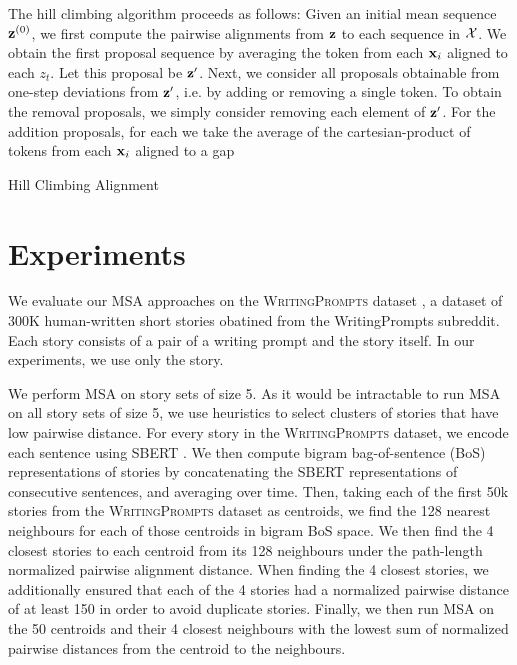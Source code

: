 \documentclass{article}
\begin{document}
The hill climbing algorithm proceeds as follows: Given an initial mean sequence $\mathbf{z}^{(0)}$,
we first compute the pairwise alignments from $\mathbf{z}$ to each sequence in $\mathcal{X}$.
We obtain the first proposal sequence by averaging the token from each $\mathbf{x}_i$ aligned
to each $z_t$.
Let this proposal be $\mathbf{z}'$.
Next, we consider all proposals obtainable from one-step deviations
from $\mathbf{z}'$, 
i.e. by adding or removing a single token.
To obtain the removal proposals, we simply consider removing each element of $\mathbf{z}'$.
For the addition proposals, for each we take the average of the cartesian-product of tokens from each
$\mathbf{x}_i$ aligned to a gap

\begin{algorithm}[h]
\begin{algorithmic}
    \EndFor
    \State{}
    \ForAll{}
    \EndFor
    \ForAll{}
    \EndFor
\EndFor
{}
\end{algorithmic}
\caption{\label{alg:hillclimbing}
Hill Climbing Alignment
}
\end{algorithm}

\section{Experiments}
We evaluate our MSA approaches on the \textsc{WritingPrompts} dataset \citep{fan2018writingprompts},
a dataset of 300K human-written short stories obatined from the WritingPrompts subreddit.
Each story consists of a pair of a writing prompt and the story itself.
In our experiments, we use only the story.

We perform MSA on story sets of size 5.
As it would be intractable to run MSA on all story sets of size 5,
we use heuristics to select clusters of stories that have low pairwise distance.
For every story in the \textsc{WritingPrompts} dataset,
we encode each sentence using SBERT \citep{reimers2019sbert}.
We then compute bigram bag-of-sentence (BoS) representations of stories by
concatenating the SBERT representations of consecutive sentences, and averaging over time.
Then, taking each of the first 50k stories from the \textsc{WritingPrompts} dataset as centroids,
we find the 128 nearest neighbours for each of those centroids in bigram BoS space.
We then find the 4 closest stories to each centroid from its 128 neighbours
under the path-length normalized pairwise alignment distance.
When finding the 4 closest stories, we additionally 
ensured that each of the 4 stories had a normalized pairwise distance of at least 150
in order to avoid duplicate stories.
Finally, we then run MSA on the 50 centroids and their 4 closest neighbours with the lowest sum 
of normalized pairwise distances from the centroid to the neighbours.
\end{document}
